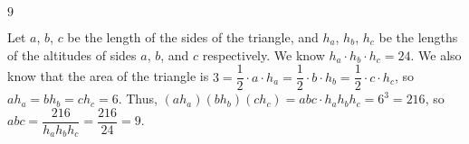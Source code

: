 \documentclass[11pt]{article}
\begin{document}
\begin{answer}
$9$
\end{answer}

\begin{solution}
Let $a$, $b$, $c$ be the length of the sides of the triangle, and $h_a$, $h_b$, $h_c$ be the lengths of the altitudes of sides $a$, $b$, and $c$ respectively. We know $h_a \cdot h_b \cdot h_c = 24$. We also know that the area of the triangle is $3 = \dfrac12 \cdot a \cdot h_a = \dfrac12 \cdot b \cdot h_b = \dfrac12 \cdot c \cdot h_c$, so $ah_a = bh_b = ch_c = 6$. Thus, $(ah_a)(bh_b)(ch_c) = abc \cdot h_ah_bh_c = 6^3 = 216$, so $abc = \dfrac{216}{h_ah_bh_c} = \dfrac{216}{24} = \boxed{9}$.
\end{solution}
\end{document}
